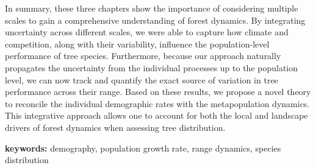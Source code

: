 In summary, these three chapters show the importance of considering multiple scales to gain a comprehensive understanding of forest dynamics. By integrating uncertainty across different scales, we were able to capture how climate and competition, along with their variability, influence the population-level performance of tree species. Furthermore, because our approach naturally propagates the uncertainty from the individual processes up to the population level, we can now track and quantify the exact source of variation in tree performance across their range. Based on these results, we propose a novel theory to reconcile the individual demographic rates with the metapopulation dynamics. This integrative approach allows one to account for both the local and landscape drivers of forest dynamics when assessing tree distribution.

\textbf{keywords:} demography, population growth rate, range dynamics, species distribution
